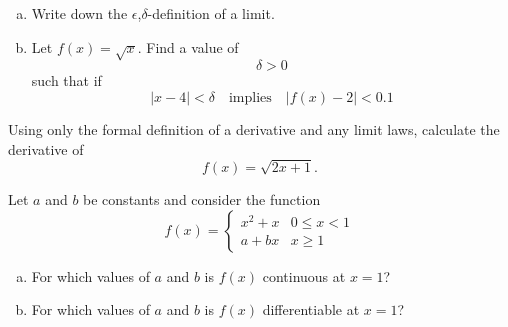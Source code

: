 \documentclass[11pt]{exam}
\theoremstyle{definition}
\begin{document}
\begin{questions}
\newpage
\question[10]
\begin{enumerate}[(a)]
\item Write down the $\epsilon$,$\delta$-definition of a limit.
\item Let $f(x) = \sqrt{x}$.  Find a value of $$\delta > 0$$ such that if
$$|x-4| < \delta\quad\text{implies}\quad |f(x)-2| < 0.1$$
\end{enumerate}


\newpage
\question[7]
Using only the formal definition of a derivative and any limit laws, calculate the derivative of
$$f(x) = \sqrt{2x+1}.$$

\newpage
\question[7]
Let $a$ and $b$ be constants and consider the function
$$f(x) = \left\lbrace\begin{array}{cc}
x^2 + x & 0\leq x < 1\\
a + bx  & x\geq 1
\end{array}\right.$$
\begin{enumerate}[(a)]
\item For which values of $a$ and $b$ is $f(x)$ continuous at $x=1$?
\vspace{3in}
\item For which values of $a$ and $b$ is $f(x)$ differentiable at $x=1$?
\end{enumerate}

\end{questions}
\end{document}
